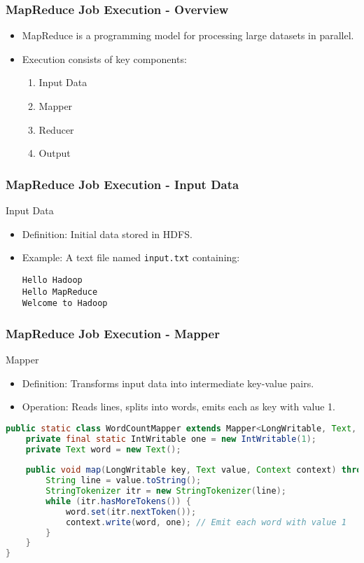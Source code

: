 \documentclass[aspectratio=169]{beamer}
\begin{document}
\begin{frame}[fragile]
    \frametitle{MapReduce Job Execution - Overview}
    \begin{itemize}
        \item MapReduce is a programming model for processing large datasets in parallel.
        \item Execution consists of key components:
        \begin{enumerate}
            \item Input Data
            \item Mapper
            \item Reducer
            \item Output
        \end{enumerate}
    \end{itemize}
\end{frame}

\begin{frame}[fragile]
    \frametitle{MapReduce Job Execution - Input Data}
    \begin{block}{Input Data}
        \begin{itemize}
            \item Definition: Initial data stored in HDFS.
            \item Example: A text file named \texttt{input.txt} containing:
            \begin{verbatim}
Hello Hadoop
Hello MapReduce
Welcome to Hadoop
            \end{verbatim}
        \end{itemize}
    \end{block}
\end{frame}

\begin{frame}[fragile]
    \frametitle{MapReduce Job Execution - Mapper}
    \begin{block}{Mapper}
        \begin{itemize}
            \item Definition: Transforms input data into intermediate key-value pairs.
            \item Operation: Reads lines, splits into words, emits each as key with value 1.
        \end{itemize}
        \begin{lstlisting}[language=Java]
public static class WordCountMapper extends Mapper<LongWritable, Text, Text, IntWritable> {
    private final static IntWritable one = new IntWritable(1);
    private Text word = new Text();
    
    public void map(LongWritable key, Text value, Context context) throws IOException, InterruptedException {
        String line = value.toString();
        StringTokenizer itr = new StringTokenizer(line);
        while (itr.hasMoreTokens()) {
            word.set(itr.nextToken());
            context.write(word, one); // Emit each word with value 1
        }
    }
}
        \end{lstlisting}
    \end{block}
\end{frame}
\end{document}
